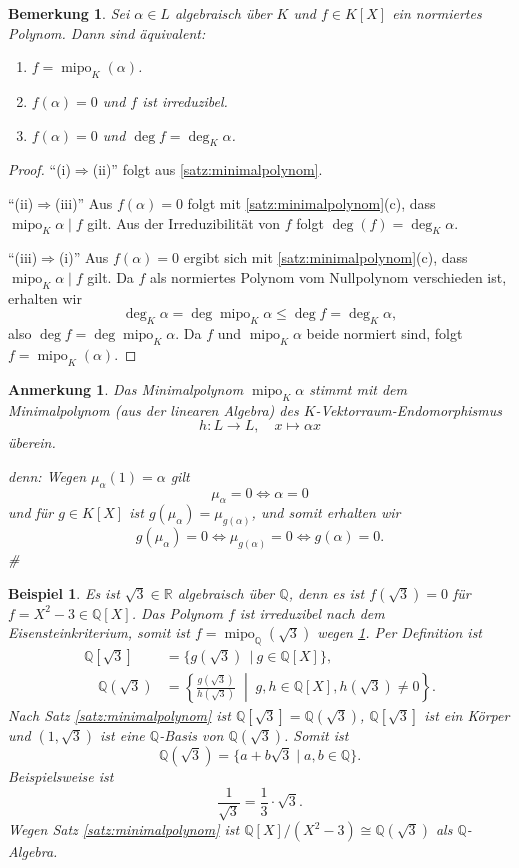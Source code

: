 \documentclass[a4paper, twoside, 11pt, ngerman]{report}
\newcommand{\QQ}{\mathds Q}
\newcommand{\RR}{\mathds R}
\DeclareMathOperator{\mipo}{mipo}
\theoremstyle{definistyle}
\newtheorem{bem}[satz]{Bemerkung}
\newtheorem{anm}[satz]{Anmerkung}
\newtheorem{bsp}[satz]{Beispiel}
\theoremstyle{remark}
\newenvironment{denn}%
  {\par\textit{denn:}}%
  {\hfill\#\par}
\begin{document}
\begin{bem}\label{bem:minpol_char}
Sei $\alpha\in L$ algebraisch über $K$ und $f\in K[X]$ ein normiertes Polynom.
Dann sind äquivalent:
\begin{enumerate}[label=(\roman*)]
\item $f=\mipo_K(\alpha)$.
\item $f(\alpha)=0$ und $f$ ist irreduzibel.
\item $f(\alpha)=0$ und $\deg f=\deg_K\alpha$.
\end{enumerate}
\end{bem}
\begin{proof}
"`(i)$\Rightarrow$(ii)"' folgt aus \ref{satz:minimalpolynom}.

"`(ii)$\Rightarrow$(iii)"' Aus $f(\alpha)=0$ folgt mit \ref{satz:minimalpolynom}(c),
dass $\mipo_K\alpha\mid f$ gilt. Aus der Irreduzibilität von $f$ folgt $\deg(f)=\deg_K\alpha$.

"`(iii)$\Rightarrow$(i)"' Aus $f(\alpha)=0$ ergibt sich mit \ref{satz:minimalpolynom}(c),
dass $\mipo_K\alpha\mid f$ gilt. Da $f$ als normiertes Polynom vom Nullpolynom verschieden ist, erhalten wir
\[\deg_K\alpha=\deg\mipo_K\alpha\leq\deg f=\deg_K\alpha,\]
also $\deg f=\deg \mipo_K\alpha$. Da $f$ und $\mipo_K\alpha$ beide normiert sind, 
folgt $f=\mipo_K(\alpha)$.
\end{proof}

\begin{anm}
Das Minimalpolynom $\mipo_K \alpha$ stimmt mit dem Minimalpolynom (aus der linearen Algebra) des $K$-Vektorraum-Endomorphismus
\[
h: L \to L, \quad x \mapsto \alpha x
\]
überein.
\begin{denn}
Wegen $\mu_\alpha(1) = \alpha$ gilt 
\[
\mu_\alpha=0\iff \alpha=0
\]
und für $g \in K[X]$ ist $g(\mu_\alpha) = \mu_{g(\alpha)}$, und somit erhalten wir
\[
g(\mu_\alpha)=0\iff \mu_{g(\alpha)}=0 \iff g(\alpha)=0.
\]
\end{denn}
\end{anm}

\begin{bsp}\label{bsp:minimalpolynom_beispiel}
Es ist $\sqrt{3}\in\RR$ algebraisch über $\QQ$, denn es ist $f(\sqrt{3}) = 0$ für $f = X^2 - 3 \in \QQ[X]$.
Das Polynom $f$ ist irreduzibel nach dem Eisensteinkriterium, somit ist $f = \mipo_\QQ(\sqrt{3})$ wegen \ref{bem:minpol_char}.
Per Definition ist
\begin{align*}
\QQ[\sqrt{3}]&=\{g(\sqrt{3}) \ \ | \ g \in \QQ[X]\}, \\
\quad \QQ(\sqrt{3}) &= \left\{\frac{g(\sqrt{3})}{h(\sqrt{3})} \;\middle|\; g, h \in \QQ[X], h(\sqrt{3}) \neq 0 \right\}.
\end{align*}
Nach Satz \ref{satz:minimalpolynom} ist $\QQ[\sqrt{3}]=\QQ(\sqrt{3})$, $\QQ[\sqrt{3}]$ ist ein Körper und $(1, \sqrt{3})$ ist eine $\QQ$-Basis von $\QQ(\sqrt{3})$. Somit ist
\[
\QQ(\sqrt{3}) = \{a + b\sqrt{3} \mid a, b \in \QQ\}.
\]
Beispielsweise ist
\[\frac{1}{\sqrt{3}} = \frac{1}{3} \cdot \sqrt{3}.\]
Wegen Satz \ref{satz:minimalpolynom} ist $\QQ[X] / (X^2 - 3) \cong \QQ(\sqrt{3})$ als $\QQ$-Algebra.
\end{bsp}
\end{document}
